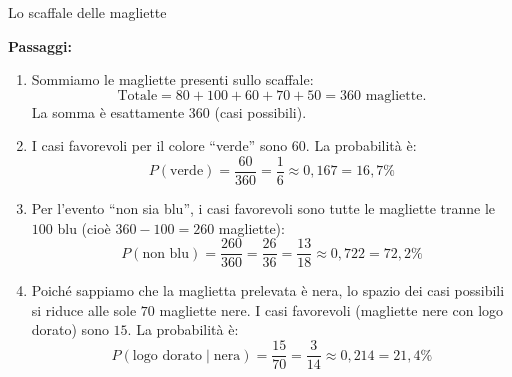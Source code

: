 \begin{esercizio}{Lo scaffale delle magliette}
\begin{soluzione}
  \textbf{Passaggi:}
  \begin{enumerate}[label=\alph*)]
    \item Sommiamo le magliette presenti sullo scaffale:
    \[
    \text{Totale} = 80 + 100 + 60 + 70 + 50 = 360 \text{ magliette}.
    \]
    La somma è esattamente $360$ (casi possibili).
    \item I casi favorevoli per il colore ``verde'' sono $60$. La probabilità è:
    \[
    P(\text{verde}) = \frac{60}{360} = \frac{1}{6} \approx 0{,}167 = 16{,}7\%
    \]
    \item Per l'evento ``non sia blu'', i casi favorevoli sono tutte le magliette tranne le $100$ blu (cioè $360 - 100 = 260$ magliette):
    \[
    P(\text{non blu}) = \frac{260}{360} = \frac{26}{36} = \frac{13}{18} \approx 0{,}722 = 72{,}2\%
    \]
    \item Poiché sappiamo che la maglietta prelevata è nera, lo spazio dei casi possibili si riduce alle sole $70$ magliette nere.
    I casi favorevoli (magliette nere con logo dorato) sono $15$. La probabilità è:
    \[
    P(\text{logo dorato} \mid \text{nera}) = \frac{15}{70} = \frac{3}{14} \approx 0{,}214 = 21{,}4\%
    \]
  \end{enumerate}
\end{soluzione}
\end{esercizio}

\condnewpage

